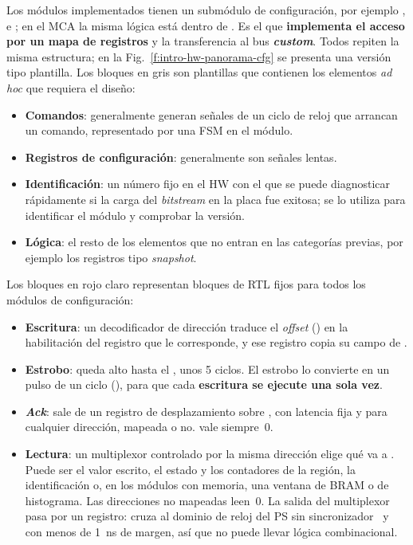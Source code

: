 Los módulos implementados tienen un submódulo de configuración, por ejemplo
,  e ; en el MCA la
misma lógica está dentro de . Es el que \textbf{implementa el
acceso por un mapa de registros} y la transferencia al bus \textbf{\emph{custom}}.
Todos repiten la misma estructura; en la Fig.~\ref{f:intro-hw-panorama-cfg} se
presenta una versión tipo plantilla. Los bloques en gris son plantillas que
contienen los elementos \emph{ad hoc} que requiera el diseño:
\begin{itemize}
  \item \textbf{Comandos}: generalmente generan señales de un ciclo de reloj que
    arrancan un comando, representado por una FSM en el módulo.
  \item \textbf{Registros de configuración}: generalmente son señales lentas.
  \item \textbf{Identificación}: un número fijo en el HW con el que se puede
    diagnosticar rápidamente si la carga del \emph{bitstream} en la placa fue exitosa;
    se lo utiliza para identificar el módulo y comprobar la versión.
  \item \textbf{Lógica}: el resto de los elementos que no entran en las
    categorías previas, por ejemplo los registros tipo \emph{snapshot}.
\end{itemize}
Los bloques en rojo claro representan bloques de RTL fijos para todos los
módulos de configuración:
\begin{itemize}
  \item \textbf{Escritura}: un decodificador de dirección traduce el \emph{offset}
    () en la habilitación del registro que le
    corresponde, y ese registro copia su campo de .
  \item \textbf{Estrobo}:  queda alto hasta el ,
    unos 5 ciclos. El estrobo lo convierte en un pulso de un ciclo
    (), para que cada
    \textbf{escritura se ejecute una sola vez}.
  \item \textbf{\emph{Ack}}: sale de un registro de desplazamiento sobre
    , con latencia fija y para cualquier
    dirección, mapeada o no.  vale siempre~0.
  \item \textbf{Lectura}: un multiplexor controlado por la misma dirección elige
    qué va a . Puede ser el valor escrito, el estado y los
    contadores de la región, la identificación o, en los módulos con memoria,
    una ventana de BRAM o de histograma. Las direcciones no mapeadas leen~0. La
    salida del multiplexor pasa por un registro:  cruza al
    dominio de reloj del PS sin sincronizador~\cite{Cummings2008} y con menos de
    \qty{1}{\nano\second} de margen, así que no puede llevar lógica
    combinacional.
\end{itemize}


